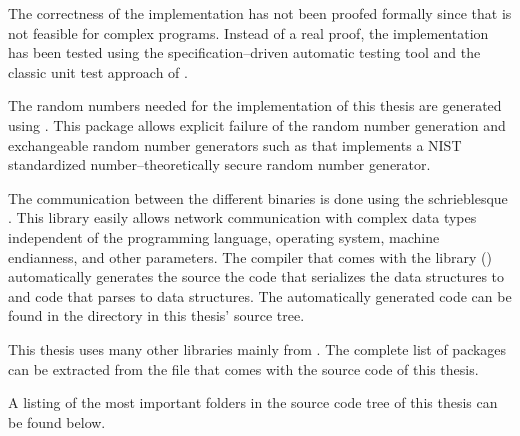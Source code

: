 The correctness of the implementation has not been proofed formally since that
is not feasible for complex programs. Instead of a real proof, the
implementation has been tested using the specification--driven automatic
\JWThaskell{} testing tool \JWTquickcheck{} \cite{quickcheck} and the classic
unit test approach of \JWTLhunit{}.



The random numbers needed for the implementation of this thesis are generated
using \JWTLmonadcryptorandom{}. This package allows explicit failure of the
random number generation and exchangeable random number generators such as
\JWTLdrbg{} that implements a NIST standardized number--theoretically secure
random number generator.


\label{sec:net-comm}

The communication between the different binaries is done using the
schrie\-bl\-esque \JWTXLprotobuf{}. This library easily allows network
communication with complex data types independent of the programming language,
operating system, machine endianness, and other parameters. The \JWThaskell{}
\JWTprotobuf{} compiler  that comes with the \JWThaskell{}
\JWTprotobuf{} library (\JWTprotobufLib{}) automatically generates the
\JWThaskell{} source the code that serializes the data structures to
\JWTprotobuf{} and code that parses \JWTprotobuf{} to \JWThaskell{} data
structures. The automatically generated code can be found in the directory
 in this thesis' source tree.



This thesis uses many other libraries mainly from \JWTLhackage{}. The
complete list of packages can be extracted from the file
 that comes with the source code of this thesis.


\label{sec:src-org}

A listing of the most important folders in the source code tree of this thesis
can be found below.

